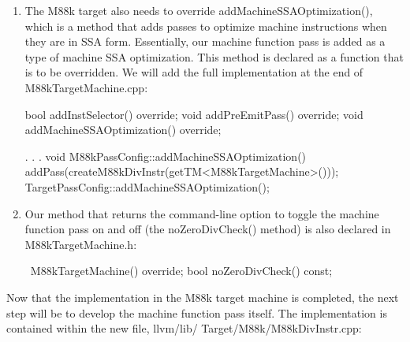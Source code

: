 \begin{enumerate}
\item
The M88k target also needs to override addMachineSSAOptimization(), which is a method that adds passes to optimize machine instructions when they are in SSA form. Essentially, our machine function pass is added as a type of machine SSA optimization. This method is declared as a function that is to be overridden. We will add the full implementation at the end of M88kTargetMachine.cpp:

\begin{cpp}
    bool addInstSelector() override;
    void addPreEmitPass() override;
    void addMachineSSAOptimization() override;

. . .
void M88kPassConfig::addMachineSSAOptimization() {
    addPass(createM88kDivInstr(getTM<M88kTargetMachine>()));
    TargetPassConfig::addMachineSSAOptimization();
}
\end{cpp}

\item
Our method that returns the command-line option to toggle the machine function pass on and off (the noZeroDivCheck() method) is also declared in M88kTargetMachine.h:

\begin{cpp}
    ~M88kTargetMachine() override;
    bool noZeroDivCheck() const;
\end{cpp}
\end{enumerate}


Now that the implementation in the M88k target machine is completed, the next step will be to develop the machine function pass itself. The implementation is contained within the new file, llvm/lib/ Target/M88k/M88kDivInstr.cpp:

